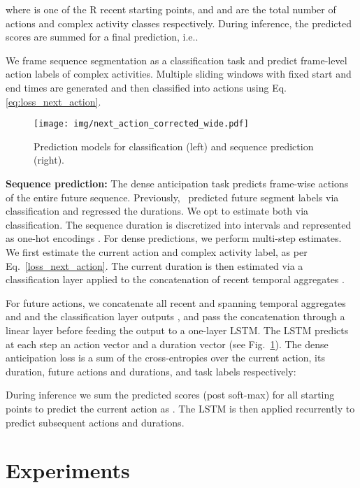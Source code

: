 \documentclass[runningheads]{llncs}
\makeatletter
\newcommand*{\ie}{i.e.\@\xspace}
\makeatother
\begin{document}
where  is one of the R recent starting points, and  and  are the total number of actions and complex activity classes respectively. During inference, the predicted scores   are summed for a final prediction, \ie . 

We frame sequence segmentation as a classification task and predict frame-level action labels of complex activities. Multiple sliding windows with fixed start and end times are generated and then classified into actions using Eq.\ref{eq:loss_next_action}. 
 
\begin{figure}[t]
\centering 
\texttt{[image: img/next\_action\_corrected\_wide.pdf]}
\caption{Prediction models for classification (left) and sequence prediction (right).} 
\label{fig:next_action_pred} 
\end{figure} 

\textbf{Sequence prediction:} The dense anticipation task predicts frame-wise actions of the entire future sequence. Previously,~\cite{abu2018will} predicted future segment labels via classification and regressed the durations. We opt to estimate both via classification. The sequence duration is discretized into  intervals and represented as one-hot encodings .  For dense predictions, we perform multi-step estimates.  We first estimate the current action and complex activity label, as per Eq.~\ref{loss_next_action}. The current duration  is then estimated via a classification layer applied to the concatenation of recent temporal aggregates . 

For future actions, we concatenate all recent and spanning temporal aggregates  and  and the classification layer outputs , and pass the concatenation through a linear layer before feeding the output to a one-layer LSTM. The LSTM predicts at each step  an action vector  and a duration vector  (see Fig.~\ref{fig:next_action_pred}).  The dense anticipation loss is a sum of the cross-entropies over the current action, its duration, future actions and durations, and task labels respectively: 
{
{

}
}
During inference we sum the predicted scores (post soft-max) for all starting points  to predict the current action as .
The LSTM is then applied recurrently to predict subsequent actions and durations.  
 
\section{Experiments}
\end{document}
